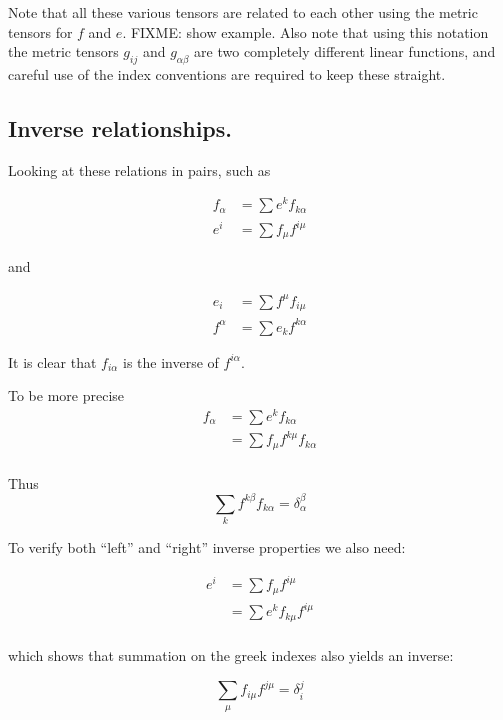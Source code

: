 \documentclass{article}      %
\begin{document}
Note that all these various tensors are related to each other using the metric tensors for $f$ and $e$.  FIXME: show example.  Also note that using this notation the metric tensors $g_{ij}$ and $g_{\alpha\beta}$ are two completely different linear functions, and careful use of the index conventions are required to keep these straight.

\subsection{ Inverse relationships. }

Looking at these relations in pairs, such as

\begin{align*}
f_{\alpha} 	&= \sum e^k f_{k\alpha} \\ 
e^i 		&= \sum f_{\mu} f^{i \mu} 
\end{align*}

and 

\begin{align*}
e_i 		&= \sum f^{\mu} f_{i\mu} \\
f^{\alpha} 	&= \sum e_k f^{k\alpha}
\end{align*}

It is clear that $f_{i\alpha}$ is the inverse of $f^{i\alpha}$.  

To be more precise 
\begin{align*}
f_{\alpha} 
&= \sum e^k f_{k\alpha} \\ 
&= \sum f_{\mu} f^{k \mu} f_{k\alpha} \\ 
\end{align*}

Thus
\begin{equation}
\sum_k f^{k \beta} f_{k\alpha} = \delta_{\alpha}^{\beta}
\end{equation}

To verify both ``left'' and ``right'' inverse properties we also need:

\begin{align*}
e^i
&= \sum f_{\mu} f^{i \mu}  \\
&= \sum e^k f_{k\mu} f^{i \mu} \\
\end{align*}

which shows that summation on the greek indexes also yields an inverse:

\begin{equation}
\sum_{\mu} f_{i\mu} f^{j \mu} = \delta_{i}^j
\end{equation}
\end{document}

